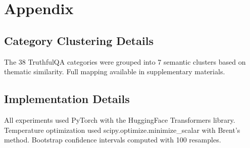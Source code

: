 \section{Appendix}

\subsection{Category Clustering Details}

The 38 TruthfulQA categories were grouped into 7 semantic clusters based on thematic similarity. Full mapping available in supplementary materials.

\subsection{Implementation Details}

All experiments used PyTorch with the HuggingFace Transformers library. Temperature optimization used scipy.optimize.minimize\_scalar with Brent's method. Bootstrap confidence intervals computed with 100 resamples.

